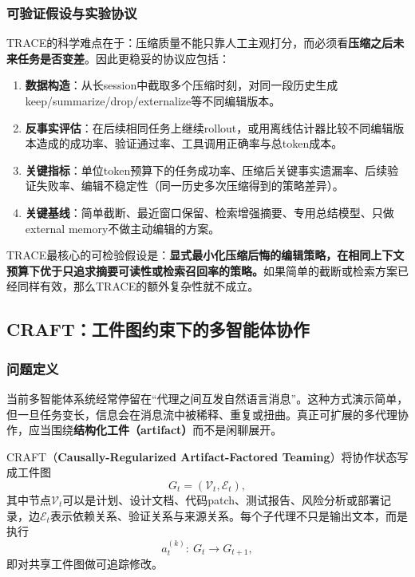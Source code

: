 \documentclass[12pt,a4paper]{article}
\begin{document}
\subsubsection{可验证假设与实验协议}

TRACE的科学难点在于：压缩质量不能只靠人工主观打分，而必须看\textbf{压缩之后未来任务是否变差}。因此更稳妥的协议应包括：

\begin{enumerate}
    \item \textbf{数据构造}：从长session中截取多个压缩时刻，对同一段历史生成keep/summarize/drop/externalize等不同编辑版本。
    \item \textbf{反事实评估}：在后续相同任务上继续rollout，或用离线估计器比较不同编辑版本造成的成功率、验证通过率、工具调用正确率与总token成本。
    \item \textbf{关键指标}：单位token预算下的任务成功率、压缩后关键事实遗漏率、后续验证失败率、编辑不稳定性（同一历史多次压缩得到的策略差异）。
    \item \textbf{关键基线}：简单截断、最近窗口保留、检索增强摘要、专用总结模型、只做external memory不做主动编辑的方案。
\end{enumerate}

TRACE最核心的可检验假设是：\textbf{显式最小化压缩后悔的编辑策略，在相同上下文预算下优于只追求摘要可读性或检索召回率的策略。}如果简单的截断或检索方案已经同样有效，那么TRACE的额外复杂性就不成立。

\subsection{CRAFT：工件图约束下的多智能体协作}

\subsubsection{问题定义}

当前多智能体系统经常停留在“代理之间互发自然语言消息”。这种方式演示简单，但一旦任务变长，信息会在消息流中被稀释、重复或扭曲。真正可扩展的多代理协作，应当围绕\textbf{结构化工件（artifact）}而不是闲聊展开。

CRAFT（\textbf{Causally-Regularized Artifact-Factored Teaming}）将协作状态写成工件图
\begin{equation}
G_t = (\mathcal{V}_t, \mathcal{E}_t),
\end{equation}
其中节点$\mathcal{V}_t$可以是计划、设计文档、代码patch、测试报告、风险分析或部署记录，边$\mathcal{E}_t$表示依赖关系、验证关系与来源关系。每个子代理不只是输出文本，而是执行
\begin{equation}
a_t^{(k)}:\ G_t \rightarrow G_{t+1},
\end{equation}
即对共享工件图做可追踪修改。
\end{document}
